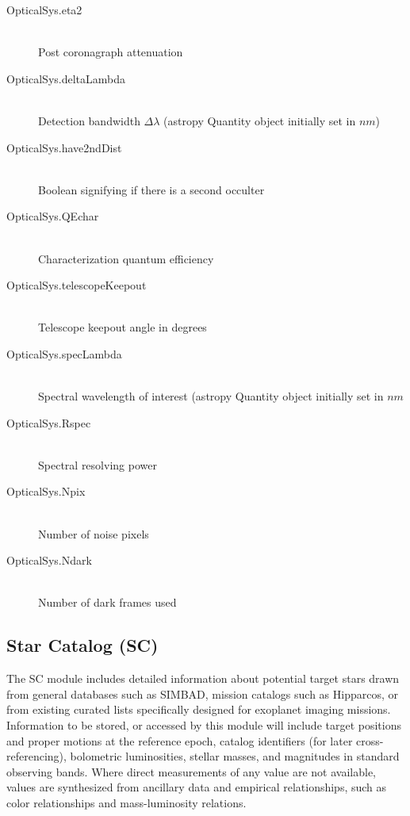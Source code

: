 \documentclass[cleanfoot]{asme2ej}
\begin{document}
\begin{itemize}
\begin{description}
        \item[OpticalSys.eta2] \hfill \\
        Post coronagraph attenuation
        \item[OpticalSys.deltaLambda] \hfill \\
        Detection bandwidth $ \Delta\lambda $ (astropy Quantity object initially set in $ nm $)
        \item[OpticalSys.have2ndDist] \hfill \\
        Boolean signifying if there is a second occulter
        \item[OpticalSys.QEchar] \hfill \\
        Characterization quantum efficiency
        \item[OpticalSys.telescopeKeepout] \hfill \\
        Telescope keepout angle in degrees
        \item[OpticalSys.specLambda] \hfill \\
        Spectral wavelength of interest (astropy Quantity object initially set in $ nm $
        \item[OpticalSys.Rspec] \hfill \\
        Spectral resolving power
        \item[OpticalSys.Npix] \hfill \\
        Number of noise pixels
        \item[OpticalSys.Ndark] \hfill \\
        Number of dark frames used
    \end{description}
\end{itemize}


\subsection{Star Catalog (SC)}
The SC module includes detailed information about potential target stars drawn from general databases such as SIMBAD, mission catalogs such as Hipparcos, or from existing curated lists specifically designed for exoplanet imaging missions.  Information to be stored, or accessed by this module will include target positions and proper motions at the reference epoch, catalog identifiers (for later cross-referencing), bolometric luminosities, stellar masses, and magnitudes in standard observing bands.  Where direct measurements of any value are not available, values are synthesized from ancillary data and empirical relationships, such as color relationships and mass-luminosity relations.
\end{document}
